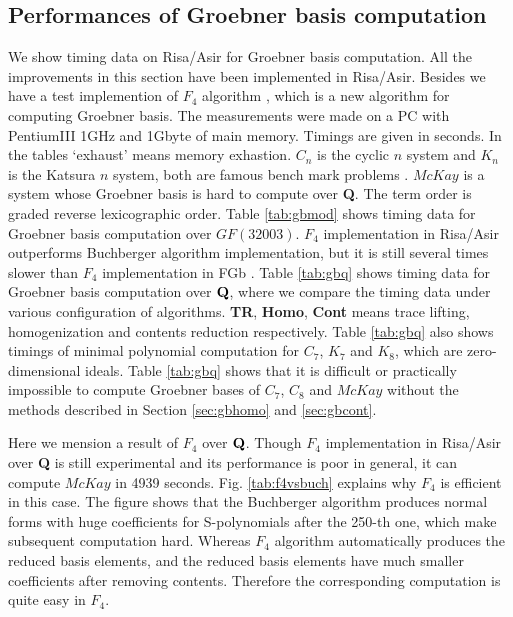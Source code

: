 \documentclass[runningheads]{cl2emult}
\def\Q{{\bf Q}}
\begin{document}

\subsection{Performances of Groebner basis computation}

We show timing data on Risa/Asir for Groebner basis computation.
All the improvements in this section have been implemented in
Risa/Asir. Besides we have a test implemention of $F_4$ algorithm
\cite{noro:F4}, which is a new algorithm for computing Groebner basis.
The measurements were made on a PC with PentiumIII
1GHz and 1Gbyte of main memory. Timings are given in seconds. In the
tables `exhaust' means memory exhastion.  $C_n$ is the cyclic $n$
system and $K_n$ is the Katsura $n$ system, both are famous bench mark
problems \cite{noro:BENCH}.  $McKay$ \cite{noro:REPL} is a system
whose Groebner basis is hard to compute over {\bf Q}.  The term order
is graded reverse lexicographic order.  Table \ref{tab:gbmod} shows
timing data for Groebner basis computation over $GF(32003)$.  $F_4$
implementation in Risa/Asir outperforms Buchberger algorithm
implementation, but it is still several times slower than $F_4$
implementation in FGb \cite{noro:FGB}.  Table \ref{tab:gbq} shows
timing data for Groebner basis computation over $\Q$, where we compare
the timing data under various configuration of algorithms. {\bf TR},
{\bf Homo}, {\bf Cont} means trace lifting, homogenization and
contents reduction respectively.  Table \ref{tab:gbq} also shows
timings of minimal polynomial computation for 
$C_7$, $K_7$ and $K_8$, which are zero-dimensional ideals.
Table \ref{tab:gbq} shows that it is difficult or practically
impossible to compute Groebner bases of $C_7$, $C_8$ and $McKay$
without the methods described in Section \ref{sec:gbhomo} and
\ref{sec:gbcont}. 

Here we mension a result of $F_4$ over $\Q$.  Though $F_4$
implementation in Risa/Asir over {\bf Q} is still experimental and its
performance is poor in general, it can compute $McKay$ in 4939 seconds.
Fig. \ref{tab:f4vsbuch} explains why $F_4$ is efficient in this case.
The figure shows that the Buchberger algorithm produces normal forms
with huge coefficients for S-polynomials after the 250-th one, which
make subsequent computation hard.  Whereas $F_4$ algorithm
automatically produces the reduced basis elements, and the reduced
basis elements have much smaller coefficients after removing contents.
Therefore the corresponding computation is quite easy in $F_4$.
\end{document}
